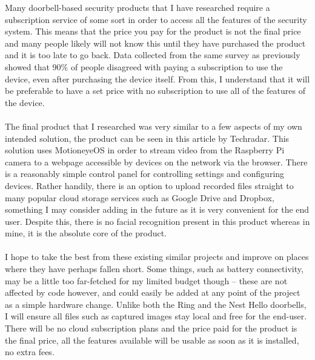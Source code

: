 \documentclass[9pt]{article}
\begin{document}
Many doorbell-based security products that I have researched require a subscription service of some sort in order to access all the features of the security system. This means that the price you pay for the product is not the final price and many people likely will not know this until they have purchased the product and it is too late to go back. Data collected from the same survey as previously showed that 90\% of people disagreed with paying a subscription to use the device, even after purchasing the device itself. From this, I understand that it will be preferable to have a set price with no subscription to use all of the features of the device. \\\\
The final product that I researched was very similar to a few aspects of my own intended solution, the product can be seen in this\cite{techradarProduct} article by Techradar. This solution uses MotioneyeOS in order to stream video from the Raspberry Pi camera to a webpage accessible by devices on the network via the browser. There is a reasonably simple control panel for controlling settings and configuring devices. Rather handily, there is an option to upload recorded files straight to many popular cloud storage services such as Google Drive and Dropbox, something I may consider adding in the future as it is very convenient for the end user. Despite this, there is no facial recognition present in this product whereas in mine, it is the absolute core of the product.\\\\
I hope to take the best from these existing similar projects and improve on places where they have perhaps fallen short. Some things, such as battery connectivity, may be a little too far-fetched for my limited budget though – these are not affected by code however, and could easily be added at any point of the project as a simple hardware change. Unlike both the Ring and the Nest Hello doorbells, I will ensure all files such as captured images stay local and free for the end-user. There will be no cloud subscription plans and the price paid for the product is the final price, all the features available will be usable as soon as it is installed, no extra fees. 



\newpage
\end{document}
